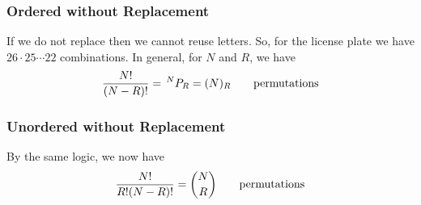 \subsubsection{Ordered without Replacement}
If we do not replace then we cannot reuse letters. So, for the license plate we have $26 \cdot 25 \cdots 22$ combinations. In general, for $N$ and $R$, we have
\begin{align}
    \frac{N!}{(N-R)!} = \, ^NP_R = (N)_R \qsp \text{permutations}
\end{align}


\subsubsection{Unordered without Replacement}
By the same logic, we now have
\begin{align}
    \frac{N!}{R!(N-R)!} = \binom{N}{R} \qsp \text{permutations}
\end{align}

